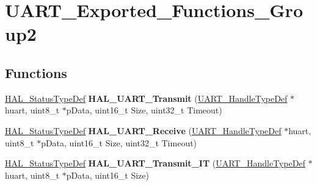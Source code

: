 \hypertarget{group___u_a_r_t___exported___functions___group2}{}\section{U\+A\+R\+T\+\_\+\+Exported\+\_\+\+Functions\+\_\+\+Group2}
\label{group___u_a_r_t___exported___functions___group2}
\subsection*{Functions}
\begin{DoxyCompactItemize}
\item 
\mbox{\label{group___u_a_r_t___exported___functions___group2_ga210329848c1873957034e129ccf8944e}} 
\mbox{\hyperlink{stm32f4xx__hal__def_8h_a63c0679d1cb8b8c684fbb0632743478f}{H\+A\+L\+\_\+\+Status\+Type\+Def}} {\bfseries H\+A\+L\+\_\+\+U\+A\+R\+T\+\_\+\+Transmit} (\mbox{\hyperlink{struct_u_a_r_t___handle_type_def}{U\+A\+R\+T\+\_\+\+Handle\+Type\+Def}} $\ast$huart, uint8\+\_\+t $\ast$p\+Data, uint16\+\_\+t Size, uint32\+\_\+t Timeout)
\item 
\mbox{\label{group___u_a_r_t___exported___functions___group2_gab868edc590e3b827a14528a25c999e2f}} 
\mbox{\hyperlink{stm32f4xx__hal__def_8h_a63c0679d1cb8b8c684fbb0632743478f}{H\+A\+L\+\_\+\+Status\+Type\+Def}} {\bfseries H\+A\+L\+\_\+\+U\+A\+R\+T\+\_\+\+Receive} (\mbox{\hyperlink{struct_u_a_r_t___handle_type_def}{U\+A\+R\+T\+\_\+\+Handle\+Type\+Def}} $\ast$huart, uint8\+\_\+t $\ast$p\+Data, uint16\+\_\+t Size, uint32\+\_\+t Timeout)
\item 
\mbox{\label{group___u_a_r_t___exported___functions___group2_gaf223f2bcc2f5734f147cc5c626d757b0}} 
\mbox{\hyperlink{stm32f4xx__hal__def_8h_a63c0679d1cb8b8c684fbb0632743478f}{H\+A\+L\+\_\+\+Status\+Type\+Def}} {\bfseries H\+A\+L\+\_\+\+U\+A\+R\+T\+\_\+\+Transmit\+\_\+\+IT} (\mbox{\hyperlink{struct_u_a_r_t___handle_type_def}{U\+A\+R\+T\+\_\+\+Handle\+Type\+Def}} $\ast$huart, uint8\+\_\+t $\ast$p\+Data, uint16\+\_\+t Size)
\item 
\mbox{\label{group___u_a_r_t___exported___functions___group2_gadc0c3ef2109881d011601f0d41e70e40}} 

\end{DoxyCompactItemize}
